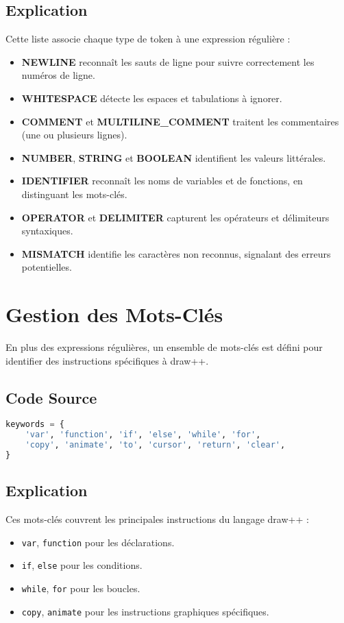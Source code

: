 \documentclass[12pt]{article}
\begin{document}
\subsection*{Explication}
Cette liste associe chaque type de token à une expression régulière :
\begin{itemize}
    \item \textbf{NEWLINE} reconnaît les sauts de ligne pour suivre correctement les numéros de ligne.
    \item \textbf{WHITESPACE} détecte les espaces et tabulations à ignorer.
    \item \textbf{COMMENT} et \textbf{MULTILINE\_COMMENT} traitent les commentaires (une ou plusieurs lignes).
    \item \textbf{NUMBER}, \textbf{STRING} et \textbf{BOOLEAN} identifient les valeurs littérales.
    \item \textbf{IDENTIFIER} reconnaît les noms de variables et de fonctions, en distinguant les mots-clés.
    \item \textbf{OPERATOR} et \textbf{DELIMITER} capturent les opérateurs et délimiteurs syntaxiques.
    \item \textbf{MISMATCH} identifie les caractères non reconnus, signalant des erreurs potentielles.
\end{itemize}

\section{Gestion des Mots-Clés}
En plus des expressions régulières, un ensemble de mots-clés est défini pour identifier des instructions spécifiques à draw++.

\subsection*{Code Source}
\begin{lstlisting}[language=Python, caption={Définition des mots-clés}]
keywords = {
    'var', 'function', 'if', 'else', 'while', 'for',
    'copy', 'animate', 'to', 'cursor', 'return', 'clear',
}
\end{lstlisting}

\subsection*{Explication}
Ces mots-clés couvrent les principales instructions du langage draw++ :
\begin{itemize}
    \item \texttt{var}, \texttt{function} pour les déclarations.
    \item \texttt{if}, \texttt{else} pour les conditions.
    \item \texttt{while}, \texttt{for} pour les boucles.
    \item \texttt{copy}, \texttt{animate} pour les instructions graphiques spécifiques.
\end{itemize}
\end{document}
